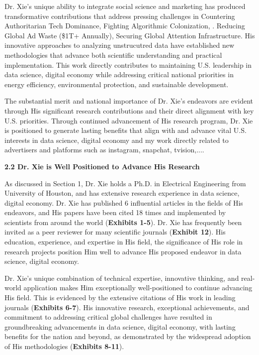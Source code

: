 \documentclass{article}
\begin{document}
Dr. Xie's unique ability to integrate social science and marketing has produced transformative contributions that address pressing challenges in Countering Authoritarian Tech Dominance, Fighting Algorithmic Colonization, . Reducing Global Ad Waste (\$1T+ Annually), Securing Global Attention Infrastructure. His innovative approaches to analyzing unstrucutred data have established new methodologies that advance both scientific understanding and practical implementation. This work directly contributes to maintaining U.S. leadership in data science, digital economy while addressing critical national priorities in energy efficiency, environmental protection, and sustainable development.

The substantial merit and national importance of Dr. Xie's endeavors are evident through His significant research contributions and their direct alignment with key U.S. priorities. Through continued advancement of His research program, Dr. Xie is positioned to generate lasting benefits that align with and advance vital U.S. interests in data science, digital economy and my work directly related to advertisers and platforms such as instagram, snapchat, tvision,....



{\bf 2.2 Dr. Xie is Well Positioned to Advance His Research}

As discussed in Section 1, Dr. Xie holds a Ph.D. in Electrical Engineering from University of Houston, and has extensive research experience in data science, digital economy. Dr. Xie has published 6 influential articles in the fields of His endeavors, and His papers have been cited 18 times and implemented by scientists from around the world (\textbf{Exhibits 1-5}). Dr. Xie has frequently been invited as a peer reviewer for many scientific journals (\textbf{Exhibit 12}). His education, experience, and expertise in His field, the significance of His role in research projects position Him well to advance His proposed endeavor in data science, digital economy.

Dr. Xie's unique combination of technical expertise, innovative thinking, and real-world application makes Him exceptionally well-positioned to continue advancing His field. This is evidenced by the extensive citations of His work in leading journals (\textbf{Exhibits 6-7}). His innovative research, exceptional achievements, and commitment to addressing critical global challenges have resulted in groundbreaking advancements in data science, digital economy, with lasting benefits for the nation and beyond, as demonstrated by the widespread adoption of His methodologies (\textbf{Exhibits 8-11}).
\end{document}
